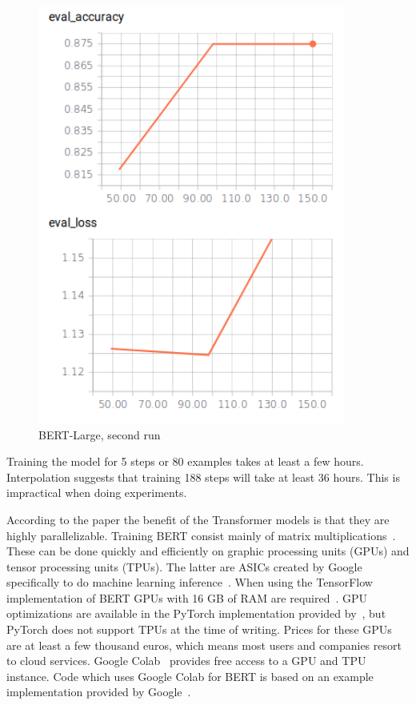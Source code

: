 \begin{figure}
\begin{minipage}{0.30\textwidth}
        \includegraphics[width=0.9\textwidth]{figures/tensorboard_askubuntu_large_2.png}
        \caption{BERT-Large, second run}
        \label{fig:tensorboard_large_2}
    \end{minipage}

\end{figure}
Training the model for 5 steps or 80 examples takes at least a few hours.
Interpolation suggests that training 188 steps will take at least 36 hours.
This is impractical when doing experiments.

According to the paper the benefit of the Transformer models is that they are highly parallelizable.
Training BERT consist mainly of matrix multiplications~\citep{dettmers2018}.
These can be done quickly and efficiently on graphic processing units (GPUs) and tensor processing units (TPUs).
The latter are ASICs created by Google specifically to do machine learning inference~\citep{jouppi2017}.
When using the TensorFlow implementation of BERT GPUs with 16 GB of RAM are required~\citep{devlin2018github}.
GPU optimizations are available in the PyTorch implementation provided by~\citet{wolf2018}, but PyTorch does not support TPUs at the time of writing.
Prices for these GPUs are at least a few thousand euros, which means most users and companies resort to cloud services.
Google Colab~\citet{google2019colab} provides free access to a GPU and TPU instance.
Code which uses Google Colab for BERT is based on an example implementation provided by Google~\citep{bajaj2018}.

